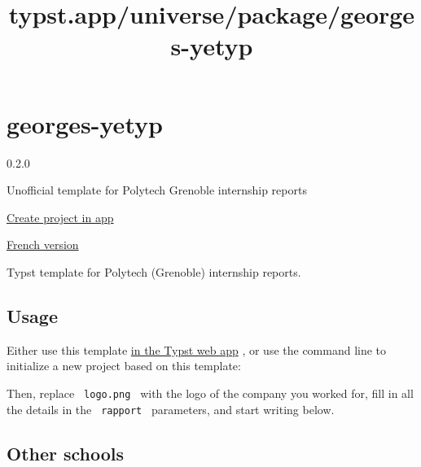 \title{typst.app/universe/package/georges-yetyp}

\label{banner}
\label{template-thumbnail}

\section{georges-yetyp}\label{georges-yetyp}

{ 0.2.0 }

Unofficial template for Polytech Grenoble internship reports

\href{/app?template=georges-yetyp&version=0.2.0}{Create project in app}

\label{readme}
\href{https://github.com/typst/packages/raw/main/packages/preview/georges-yetyp/0.2.0/README.fr.md}{French
version}

Typst template for Polytech (Grenoble) internship reports.

\href{https://github.com/typst/packages/raw/main/packages/preview/georges-yetyp/0.2.0/thumbnail.png}{}

\subsection{Usage}\label{usage}

Either use this template
\href{https://typst.app/?template=georges-yetyp&version=0.1.0}{in the
Typst web app} , or use the command line to initialize a new project
based on this template:

\begin{Shaded}
\begin{Highlighting}[]
\end{Highlighting}
\end{Shaded}

Then, replace \texttt{\ logo.png\ } with the logo of the company you
worked for, fill in all the details in the \texttt{\ rapport\ }
parameters, and start writing below.

\subsection{Other schools}\label{other-schools}

